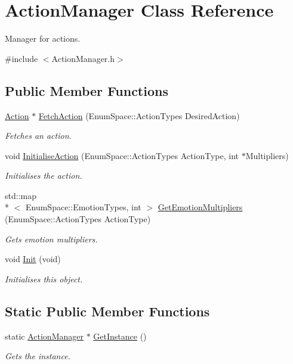 \hypertarget{class_action_manager}{\section{Action\-Manager Class Reference}
\label{class_action_manager}
}


Manager for actions.  




{\ttfamily \#include $<$Action\-Manager.\-h$>$}

\subsection*{Public Member Functions}
\begin{DoxyCompactItemize}
\item 
\hyperlink{class_action}{Action} $\ast$ \hyperlink{class_action_manager_ac0522de689b6f41724ebd2aca646646d}{Fetch\-Action} (Enum\-Space\-::\-Action\-Types Desired\-Action)
\begin{DoxyCompactList}\small\item\em Fetches an action. \end{DoxyCompactList}\item 
void \hyperlink{class_action_manager_a6ab448b8fb4a0df2dd9ee0887c5dfcef}{Initialise\-Action} (Enum\-Space\-::\-Action\-Types Action\-Type, int $\ast$Multipliers)
\begin{DoxyCompactList}\small\item\em Initialises the action. \end{DoxyCompactList}\item 
std\-::map\\*
$<$ Enum\-Space\-::\-Emotion\-Types, int $>$ \hyperlink{class_action_manager_a8e9097726d1dbeb537a1d64edd24fce8}{Get\-Emotion\-Multipliers} (Enum\-Space\-::\-Action\-Types Action\-Type)
\begin{DoxyCompactList}\small\item\em Gets emotion multipliers. \end{DoxyCompactList}\item 
void \hyperlink{class_action_manager_a75f119f905f44a55f7ca3bf2ccd00467}{Init} (void)
\begin{DoxyCompactList}\small\item\em Initialises this object. \end{DoxyCompactList}\end{DoxyCompactItemize}
\subsection*{Static Public Member Functions}
\begin{DoxyCompactItemize}
\item 
static \hyperlink{class_action_manager}{Action\-Manager} $\ast$ \hyperlink{class_action_manager_a91970883f9197898ed801f9a80b59595}{Get\-Instance} ()
\begin{DoxyCompactList}\small\item\em Gets the instance. \end{DoxyCompactList}\end{DoxyCompactItemize}



